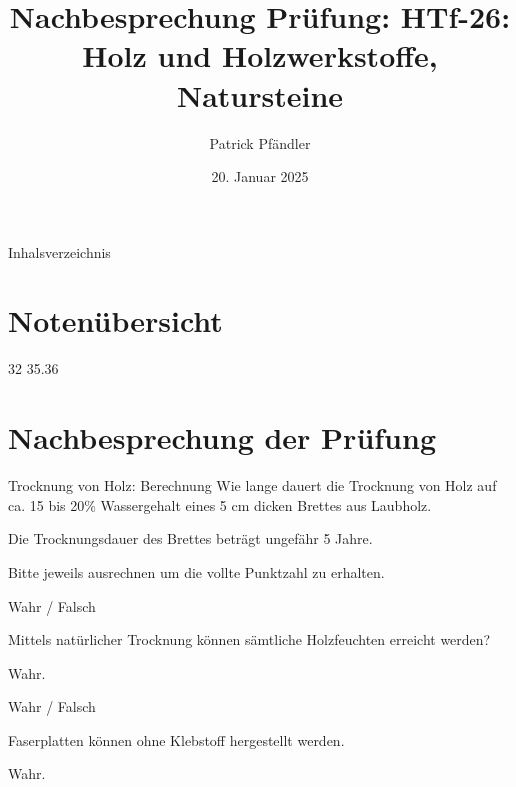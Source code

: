 \def\customoptions{aspectratio=169} %

\usepackage{fontawesome}  %


\title{\textbf{Nachbesprechung Prüfung: HTf-26: Holz und Holzwerkstoffe, Natursteine 
}}
\author{Patrick Pfändler}
\date{20. Januar 2025}



\frame{\titlepage}

\begin{frame}{Inhalsverzeichnis}
    \tableofcontents
\end{frame}

\section{Notenübersicht}
\BlueSectionSlide

{
    32%
}
{
    35.36%
}


\section{Nachbesprechung der Prüfung}
\BlueSectionSlide

\begin{frame}{Trocknung von Holz: Berechnung}
Wie lange dauert die Trocknung von Holz auf ca. 15 bis 20\% Wassergehalt eines 5 cm dicken Brettes aus Laubholz.
\pause
\begin{myLösung}
Die Trocknungsdauer des Brettes beträgt ungefähr 5 Jahre.
\end{myLösung}

Bitte jeweils ausrechnen um die vollte Punktzahl zu erhalten.

\end{frame}

\begin{frame}{Wahr / Falsch}

\begin{Fragenblock}
    Mittels natürlicher Trocknung können sämtliche Holzfeuchten erreicht werden?
\end{Fragenblock}
\pause

\begin{myLösung}
Wahr.
\end{myLösung}

\end{frame}
\begin{frame}{Wahr / Falsch}

\begin{Fragenblock}
    Faserplatten können ohne Klebstoff hergestellt werden.
\end{Fragenblock}
\pause

\begin{myLösung}
Wahr.
\end{myLösung}
\end{frame}

